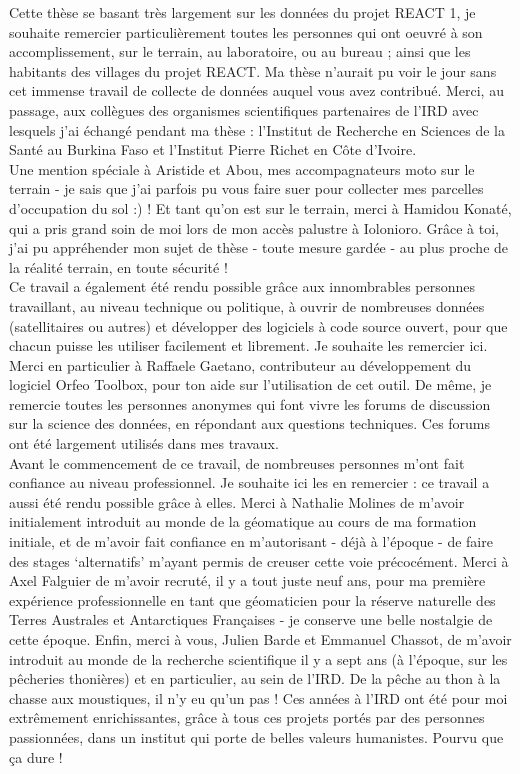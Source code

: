 \documentclass[12pt,twoside]{reedthesis}
\begin{document}
\begin{acknowledgements}
    Cette thèse se basant très largement sur les données du projet REACT 1, je souhaite remercier particulièrement toutes les personnes qui ont oeuvré à son accomplissement, sur le terrain, au laboratoire, ou au bureau ; ainsi que les habitants des villages du projet REACT. Ma thèse n'aurait pu voir le jour sans cet immense travail de collecte de données auquel vous avez contribué. Merci, au passage, aux collègues des organismes scientifiques partenaires de l'IRD avec lesquels j'ai échangé pendant ma thèse : l'Institut de Recherche en Sciences de la Santé au Burkina Faso et l'Institut Pierre Richet en Côte d'Ivoire.\\

    Une mention spéciale à Aristide et Abou, mes accompagnateurs moto sur le terrain - je sais que j'ai parfois pu vous faire suer pour collecter mes parcelles d'occupation du sol :) ! Et tant qu'on est sur le terrain, merci à Hamidou Konaté, qui a pris grand soin de moi lors de mon accès palustre à Iolonioro. Grâce à toi, j'ai pu appréhender mon sujet de thèse - toute mesure gardée - au plus proche de la réalité terrain, en toute sécurité !\\

    Ce travail a également été rendu possible grâce aux innombrables personnes travaillant, au niveau technique ou politique, à ouvrir de nombreuses données (satellitaires ou autres) et développer des logiciels à code source ouvert, pour que chacun puisse les utiliser facilement et librement. Je souhaite les remercier ici. Merci en particulier à Raffaele Gaetano, contributeur au développement du logiciel Orfeo Toolbox, pour ton aide sur l'utilisation de cet outil. De même, je remercie toutes les personnes anonymes qui font vivre les forums de discussion sur la science des données, en répondant aux questions techniques. Ces forums ont été largement utilisés dans mes travaux.\\

    Avant le commencement de ce travail, de nombreuses personnes m'ont fait confiance au niveau professionnel. Je souhaite ici les en remercier : ce travail a aussi été rendu possible grâce à elles. Merci à Nathalie Molines de m'avoir initialement introduit au monde de la géomatique au cours de ma formation initiale, et de m'avoir fait confiance en m'autorisant - déjà à l'époque - de faire des stages `alternatifs' m'ayant permis de creuser cette voie précocément. Merci à Axel Falguier de m'avoir recruté, il y a tout juste neuf ans, pour ma première expérience professionnelle en tant que géomaticien pour la réserve naturelle des Terres Australes et Antarctiques Françaises - je conserve une belle nostalgie de cette époque. Enfin, merci à vous, Julien Barde et Emmanuel Chassot, de m'avoir introduit au monde de la recherche scientifique il y a sept ans (à l'époque, sur les pêcheries thonières) et en particulier, au sein de l'IRD. De la pêche au thon à la chasse aux moustiques, il n'y eu qu'un pas ! Ces années à l'IRD ont été pour moi extrêmement enrichissantes, grâce à tous ces projets portés par des personnes passionnées, dans un institut qui porte de belles valeurs humanistes. Pourvu que ça dure !\\


\end{acknowledgements}
\end{document}
